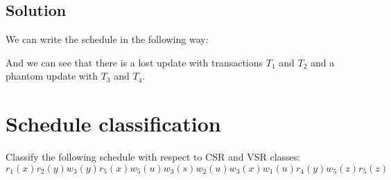 \documentclass[12pt, a4paper]{report}
\newtheorem[style=M,bodystyle=\normalfont]{theorem}{Theorem}
\newtheorem[style=M,bodystyle=\normalfont]{corollary}{Corollary}
\newtheorem[style=M,bodystyle=\normalfont]{lemma}{Lemma}
\newtheorem[style=M,bodystyle=\normalfont]{definition}{Definition}
\begin{document}
    \subsection*{Solution}
        We can write the schedule in the following way:
        \begin{table}[H]
            \centering
        \end{table}
        And we can see that there is a lost update with transactions $T_1$ and $T_2$ and a phantom update with $T_3$ and $T_4$. 

    \newpage
    
    \section{Schedule classification}
        Classify the following schedule with respect to CSR and VSR classes: 
        \[r_1(x) r_2(y) w_3(y) r_5(x) w_5(u) w_3(s)w_2(u) w_3(x) w_1(u) r_4(y) w_5(z) r_5(z)\]
\end{document}
